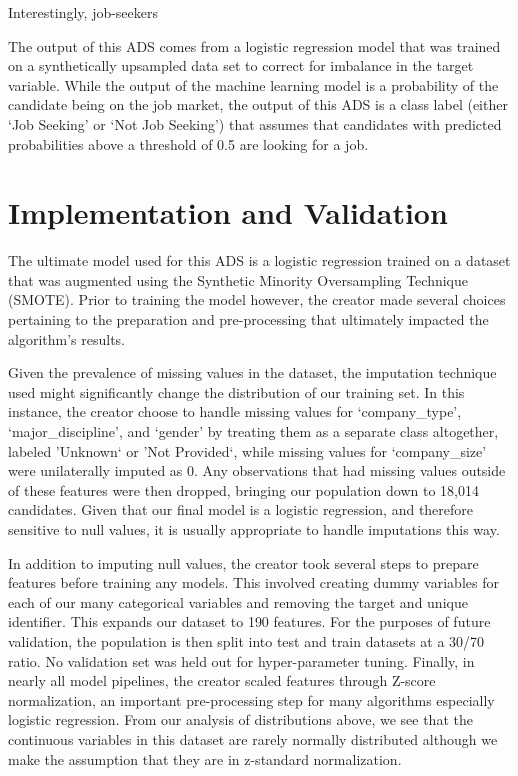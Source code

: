 Interestingly, job-seekers 








 

The output of this ADS comes from a logistic regression model that was trained on a synthetically upsampled data set to correct for imbalance in the target variable.  While the output of the machine learning model is a probability of the candidate being on the job market, the output of this ADS is a class label (either `Job Seeking' or `Not Job Seeking') that assumes that candidates with predicted probabilities above a threshold of 0.5 are looking for a job.




\pagebreak

\section{Implementation and Validation}

The ultimate model used for this ADS is a logistic regression trained on a dataset that was augmented using the Synthetic Minority Oversampling Technique (SMOTE).  Prior to training the model however, the creator made several choices pertaining to the preparation and pre-processing that ultimately impacted the algorithm's results.

Given the prevalence of missing values in the dataset, the imputation technique used might significantly change the distribution of our training set.  In this instance, the creator choose to handle missing values for `company\_type', `major\_discipline', and `gender' by treating them as a separate class altogether, labeled 'Unknown` or 'Not Provided`, while missing values for `company\_size' were unilaterally imputed as 0. Any observations that had missing values outside of these features were then dropped, bringing our population down to 18,014 candidates. Given that our final model is a logistic regression, and therefore sensitive to null values, it is usually appropriate to handle imputations this way.

In addition to imputing null values, the creator took several steps to prepare features before training any models.  This involved creating dummy variables for each of our many categorical variables and removing the target and unique identifier.  This expands our dataset to 190 features. For the purposes of future validation, the population is then split into test and train datasets at a 30/70 ratio.  No validation set was held out for hyper-parameter tuning.  Finally, in nearly all model pipelines, the creator scaled features through Z-score normalization, an important pre-processing step for many algorithms especially logistic regression.  From our analysis of distributions above, we see that the continuous variables in this dataset are rarely normally distributed although we make the assumption that they are in z-standard normalization.

